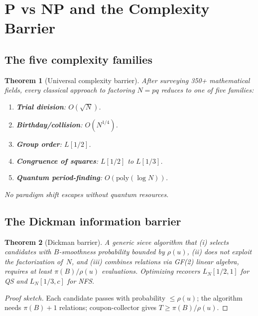 \documentclass[12pt]{amsart}
\newtheorem{theorem}{Theorem}[section]
\theoremstyle{definition}
\theoremstyle{remark}
\begin{document}
\section{P vs NP and the Complexity Barrier}\label{sec:pvsnp}

\subsection{The five complexity families}

\begin{theorem}[Universal complexity barrier]\label{thm:barrier}
After surveying 350+ mathematical fields, every classical approach to
factoring $N = pq$ reduces to one of five families:
\begin{enumerate}
  \item \textbf{Trial division}: $O(\sqrt{N})$.
  \item \textbf{Birthday/collision}: $O(N^{1/4})$.
  \item \textbf{Group order}: $L[1/2]$.
  \item \textbf{Congruence of squares}: $L[1/2]$ to $L[1/3]$.
  \item \textbf{Quantum period-finding}: $O(\mathrm{poly}(\log N))$.
\end{enumerate}
No paradigm shift escapes without quantum resources.
\end{theorem}

\subsection{The Dickman information barrier}

\begin{theorem}[Dickman barrier]\label{thm:dickman}
A generic sieve algorithm that (i) selects candidates with $B$-smoothness
probability bounded by $\rho(u)$, (ii) does not exploit the factorization
of~$N$, and (iii) combines relations via GF(2) linear algebra, requires at
least $\pi(B)/\rho(u)$ evaluations. Optimizing recovers $L_N[1/2, 1]$ for
QS and $L_N[1/3, c]$ for NFS.
\end{theorem}

\begin{proof}[Proof sketch]
Each candidate passes with probability $\le \rho(u)$; the algorithm needs
$\pi(B)+1$ relations; coupon-collector gives $T \ge \pi(B)/\rho(u)$.
\end{proof}
\end{document}
